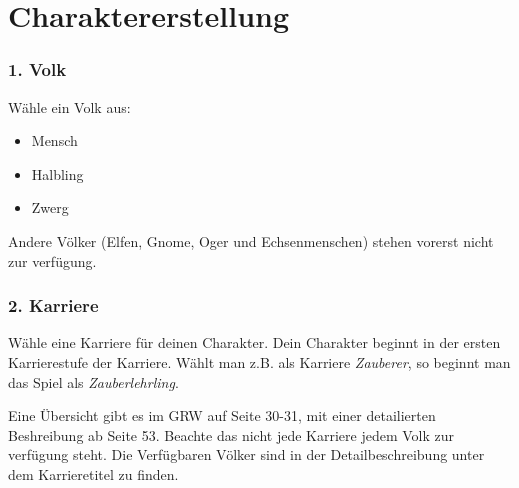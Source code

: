 \documentclass[a4paper,10pt,twoside,twocolumn,openany,nodeprecatedcode,bg=print]{dndbook}
\begin{document}
\chapter{Charaktererstellung}

\subsection{1. Volk}
Wähle ein Volk aus:
\begin{itemize}[noitemsep]
  \item Mensch
  \item Halbling
  \item Zwerg
\end{itemize}
Andere Völker (Elfen, Gnome, Oger und Echsenmenschen) stehen vorerst nicht zur verfügung.

\subsection{2. Karriere}
Wähle eine Karriere für deinen Charakter.
Dein Charakter beginnt in der ersten Karrierestufe der Karriere. Wählt man z.B. als Karriere \textit{Zauberer}, so beginnt man das Spiel als \textit{Zauberlehrling}.

Eine Übersicht gibt es im GRW auf Seite 30-31, mit einer detailierten Beshreibung ab Seite 53.
Beachte das nicht jede Karriere jedem Volk zur verfügung steht. Die Verfügbaren Völker sind in der Detailbeschreibung unter dem Karrieretitel zu finden.
\end{document}
